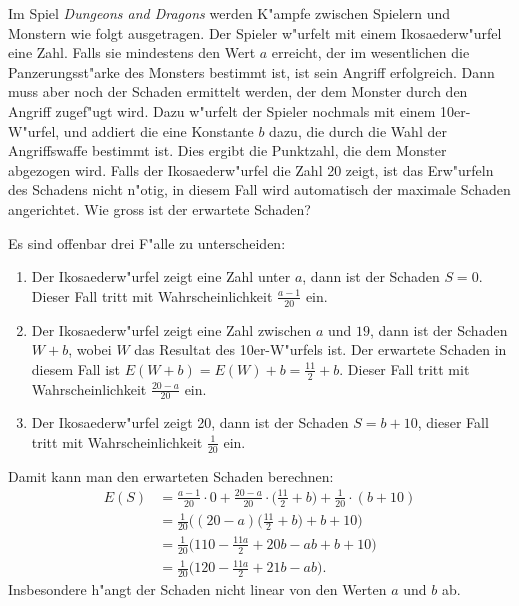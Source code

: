 Im Spiel {\it Dungeons and Dragons} werden K"ampfe zwischen Spielern und
Monstern wie folgt ausgetragen.
Der Spieler w"urfelt mit einem Ikosaederw"urfel eine Zahl.
Falls sie mindestens den Wert
$a$ erreicht, der im wesentlichen die Panzerungsst"arke
des Monsters bestimmt ist, ist sein Angriff erfolgreich. Dann muss aber noch der
Schaden ermittelt werden, der dem Monster durch den Angriff zugef"ugt wird.
Dazu w"urfelt der Spieler nochmals mit einem 10er-W"urfel, und addiert die
eine Konstante $b$ dazu, die durch die Wahl der Angriffswaffe bestimmt ist.
Dies ergibt die Punktzahl, die dem Monster abgezogen wird.
Falls der Ikosaederw"urfel die Zahl 20 zeigt, ist das Erw"urfeln des
Schadens nicht n"otig, in diesem Fall wird automatisch der maximale
Schaden angerichtet. Wie gross ist der erwartete Schaden?

\begin{loesung}
Es sind offenbar drei F"alle zu unterscheiden:
\begin{enumerate}
\item Der Ikosaederw"urfel zeigt eine Zahl unter $a$, dann ist der Schaden
$S=0$. Dieser Fall tritt mit Wahrscheinlichkeit $\frac{a-1}{20}$ ein.
\item Der Ikosaederw"urfel zeigt eine Zahl zwischen $a$ und $19$,
dann ist der Schaden $W+b$, wobei $W$ das Resultat des 10er-W"urfels ist.
Der erwartete Schaden in diesem Fall ist $E(W+b)=E(W)+b=\frac{11}2 + b$.
Dieser Fall tritt mit Wahrscheinlichkeit $\frac{20-a}{20}$ ein.
\item Der Ikosaederw"urfel zeigt 20, dann ist der Schaden $S=b + 10$,
dieser Fall tritt mit Wahrscheinlichkeit $\frac1{20}$ ein.
\end{enumerate}
Damit kann man den erwarteten Schaden berechnen:
\begin{align*}
E(S)&=\frac{a-1}{20}\cdot 0 + \frac{20-a}{20}\cdot \biggl(\frac{11}2+b\biggr)
+\frac1{20}\cdot (b+10)
\\
&=
\frac1{20}\biggl(
(20-a)\biggl(\frac{11}2+b\biggr)+b+10
\biggr)
\\
&=
\frac1{20}\biggl(
110 -\frac{11a}2+20b-ab + b + 10
\biggr)
\\
&=
\frac1{20}\biggl(
120 -\frac{11a}2+21b-ab
\biggr).
\end{align*}
Insbesondere h"angt der Schaden nicht linear von den Werten $a$ und $b$ ab.
\end{loesung}
